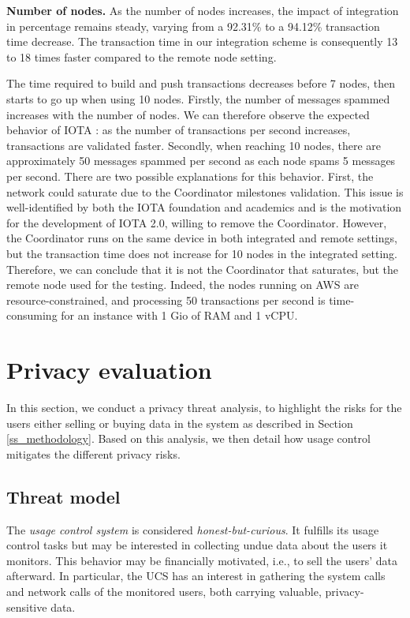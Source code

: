 \textbf{Number of nodes.} As the number of nodes increases, the impact of integration in percentage remains steady, varying from a 92.31\% to a 94.12\% transaction time decrease. The transaction time in our integration scheme is consequently 13 to 18 times faster compared to the remote node setting.

The time required to build and push transactions decreases before 7 nodes, then starts to go up when using 10 nodes. Firstly, the number of messages spammed increases with the number of nodes. We can therefore observe the expected behavior of IOTA \cite{Popov2017}: as the number of transactions per second increases, transactions are validated faster. Secondly, when reaching 10 nodes, there are approximately 50 messages spammed per second as each node spams 5 messages per second. There are two possible explanations for this behavior. First, the network could saturate due to the Coordinator milestones validation.
This issue is well-identified by both the IOTA foundation and academics \cite{Conti2022, Wang2022} and is the motivation for the development of IOTA 2.0, willing to remove the Coordinator. However, the Coordinator runs on the same device in both integrated and remote settings, but the transaction time does not increase for 10 nodes in the integrated setting. Therefore, we can conclude that it is not the Coordinator that saturates, but the remote node used for the testing. Indeed, the nodes running on AWS are resource-constrained, and processing 50 transactions per second is time-consuming for an instance with 1 Gio of RAM and 1 vCPU.

\section{Privacy evaluation}
\label{S_privacy_evaluation}
 In this section, we conduct a privacy threat analysis, to highlight the risks for the users either selling or buying data in the system as described in Section \ref{ss_methodology}. Based on this analysis, we then detail how usage control mitigates the different privacy risks.

\subsection{Threat model} The \emph{usage control system} is considered \emph{honest-but-curious}. It fulfills its usage control tasks but may be interested in collecting undue data about the users it monitors. This behavior may be financially motivated, i.e., to sell the users' data afterward. In particular, the UCS has an interest in gathering the system calls and network calls of the monitored users, both carrying valuable, privacy-sensitive data.

